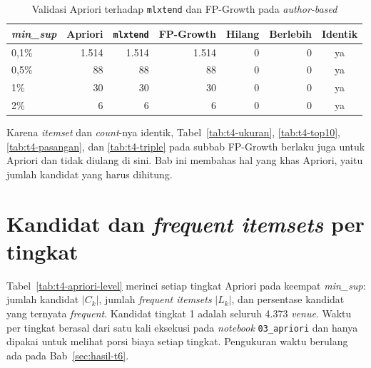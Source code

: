 \begin{table}[ht]
\caption{Validasi Apriori terhadap \texttt{mlxtend} dan FP-Growth pada \textit{author-based}}
\label{tab:t4-apriori-validasi}
\small
\begin{tabular}{@{}lrrrrrc@{}}
\toprule
\textbf{\textit{min\_sup}} & \textbf{Apriori} & \textbf{\texttt{mlxtend}} & \textbf{FP-Growth} & \textbf{Hilang} & \textbf{Berlebih} & \textbf{Identik} \\
\midrule
0,1\% & 1.514 & 1.514 & 1.514 & 0 & 0 & ya \\
0,5\% & 88 & 88 & 88 & 0 & 0 & ya \\
1\% & 30 & 30 & 30 & 0 & 0 & ya \\
2\% & 6 & 6 & 6 & 0 & 0 & ya \\
\bottomrule
\end{tabular}
\end{table}

Karena \textit{itemset} dan \textit{count}-nya identik, Tabel~\ref{tab:t4-ukuran}, \ref{tab:t4-top10}, \ref{tab:t4-pasangan}, dan \ref{tab:t4-triple} pada subbab FP-Growth berlaku juga untuk Apriori dan tidak diulang di sini. Bab ini membahas hal yang khas Apriori, yaitu jumlah kandidat yang harus dihitung.

\section{Kandidat dan \textit{frequent itemsets} per tingkat}
\label{sec:hasil-t4-apriori-kandidat}
Tabel~\ref{tab:t4-apriori-level} merinci setiap tingkat Apriori pada keempat \textit{min\_sup}: jumlah kandidat $|C_k|$, jumlah \textit{frequent itemsets} $|L_k|$, dan persentase kandidat yang ternyata \textit{frequent}. Kandidat tingkat 1 adalah seluruh 4.373 \textit{venue}. Waktu per tingkat berasal dari satu kali eksekusi pada \textit{notebook} \texttt{03\_apriori} dan hanya dipakai untuk melihat porsi biaya setiap tingkat. Pengukuran waktu berulang ada pada Bab~\ref{sec:hasil-t6}.

